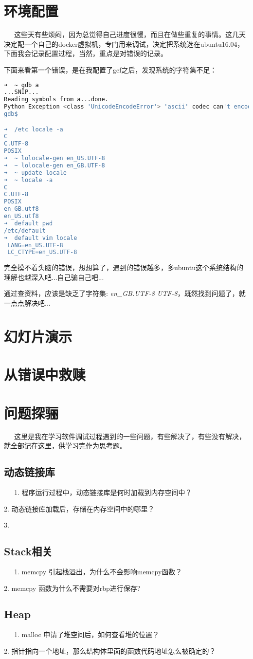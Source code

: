\documentclass[12pt]{article}  %
\begin{document}
\section{环境配置} %
\label{sec:绘制图表}
\ \ \ 这些天有些烦闷，因为总觉得自己进度很慢，而且在做些重复的事情。这几天决定配一个自己的docker虚拟机，专门用来调试，决定把系统选在ubuntu16.04，下面我会记录配置过程，当然，重点是对错误的记录。\par
下面来看第一个错误，是在我配置了gef之后，发现系统的字符集不足：
\begin{lstlisting}[language=sh]
➜  ~ gdb a 
...SNIP...
Reading symbols from a...done.
Python Exception <class 'UnicodeEncodeError'> 'ascii' codec can't encode character '\u27a4' in position 12: ordinal not in range(128): 
gdb$ 

➜  /etc locale -a
C
C.UTF-8
POSIX
➜  ~ lolocale-gen en_US.UTF-8
➜  ~ lolocale-gen en_GB.UTF-8
➜  ~ update-locale
➜  ~ locale -a
C
C.UTF-8
POSIX
en_GB.utf8
en_US.utf8
➜  default pwd
/etc/default
➜  default vim locale 
 LANG=en_US.UTF-8
 LC_CTYPE=en_US.UTF-8

\end{lstlisting}
完全摸不着头脑的错误，想想算了，遇到的错误越多，多ubuntu这个系统结构的理解也越深入吧...自己骗自己吧...\par
通过查资料，应该是缺乏了字符集: \emph{en\_GB.UTF-8 UTF-8}，既然找到问题了，就一点点解决吧...
\section{幻灯片演示} %
\label{sec:幻灯片演示}
\section{从错误中救赎} %
\label{sec:从错误中救赎}
\section{问题探骊} %
\ \ \ 这里是我在学习软件调试过程遇到的一些问题，有些解决了，有些没有解决，就全部记在这里，供学习完作为思考题。
\label{sec:Latex无极限}
\subsection{动态链接库}
\ \ \ 1. 程序运行过程中，动态链接库是何时加载到内存空间中？\par
2. 动态链接库加载后，存储在内存空间中的哪里？\par
3.  
\subsection{Stack相关}
\ \ \ 1. memcpy 引起栈溢出，为什么不会影响memcpy函数？\par
2. memcpy 函数为什么不需要对rbp进行保存?\par
\subsection{Heap}
\ \ \ 1. malloc 申请了堆空间后，如何查看堆的位置？\par
2. 指针指向一个地址，那么结构体里面的函数代码地址怎么被确定的？
\end{document}
